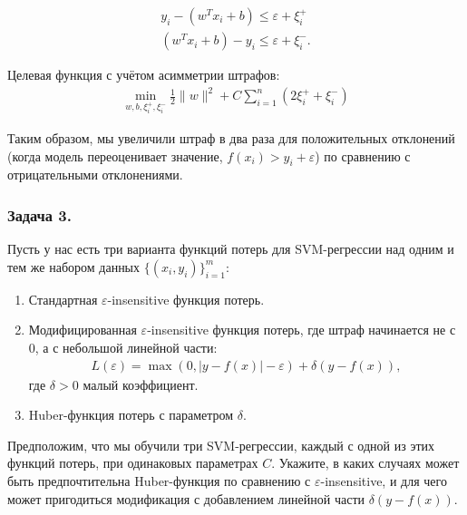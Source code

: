 \begin{align*}
    y_i - (w^Tx_i + b) \leq \varepsilon + \xi_i^+\\
    (w^Tx_i + b) - y_i \leq \varepsilon + \xi_i^-.
\end{align*}

Целевая функция с учётом асимметрии штрафов:
\begin{align*}
    \min_{w, b, \xi_i^+, \xi_i^-} \frac{1}{2} \| w \|^2 + C \sum\limits_{i = 1}^n (2\xi_i^+ + \xi_i^-)
\end{align*}

Таким образом, мы увеличили штраф в два раза для положительных отклонений (когда модель переоценивает значение, \(f(x_i) > y_i +\varepsilon\)) по сравнению с отрицательными отклонениями.

\subsubsection{Задача 3.}
Пусть у нас есть три варианта функций потерь для SVM-регрессии над одним и тем же набором данных \(\{(x_i, y_i)\}_{i=1}^m\):
\begin{enumerate}
    \item Стандартная \(\varepsilon\)-insensitive функция потерь.
    \item Модифицированная \(\varepsilon\)-insensitive функция потерь, где штраф начинается не с \(0\), а с небольшой линейной части: 
    \begin{align*}
        L(\varepsilon) = \max(0, | y - f(x) | - \varepsilon) + \delta(y - f(x)),
    \end{align*}
    где \(\delta > 0\) малый коэффициент.

    \item Huber-функция потерь с параметром \(\delta\).
\end{enumerate}

Предположим, что мы обучили три SVM-регрессии, каждый с одной из этих функций потерь, при одинаковых параметрах \(C\). Укажите, в каких случаях может быть предпочтительна Huber-функция по сравнению с 
\(\varepsilon\)-insensitive, и для чего может пригодиться модификация с добавлением линейной части \(\delta(y - f(x))\).

